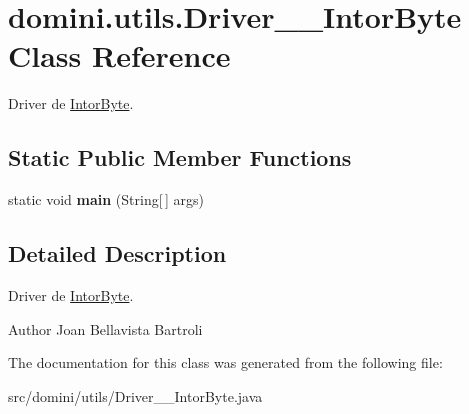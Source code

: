 \hypertarget{classdomini_1_1utils_1_1Driver____IntorByte}{}\section{domini.\+utils.\+Driver\+\_\+\+\_\+\+Intor\+Byte Class Reference}
\label{classdomini_1_1utils_1_1Driver____IntorByte}


Driver de \hyperlink{classdomini_1_1utils_1_1IntorByte}{Intor\+Byte}.  


\subsection*{Static Public Member Functions}
\begin{DoxyCompactItemize}
\item 
\mbox{\label{classdomini_1_1utils_1_1Driver____IntorByte_a82ac3bdc9baf9f3fa1b8984733d03240}} 
static void {\bfseries main} (String\mbox{[}$\,$\mbox{]} args)
\end{DoxyCompactItemize}


\subsection{Detailed Description}
Driver de \hyperlink{classdomini_1_1utils_1_1IntorByte}{Intor\+Byte}. 

\begin{DoxyAuthor}{Author}
Joan Bellavista Bartroli 
\end{DoxyAuthor}


The documentation for this class was generated from the following file\+:\begin{DoxyCompactItemize}
\item 
src/domini/utils/Driver\+\_\+\+\_\+\+Intor\+Byte.\+java\end{DoxyCompactItemize}
